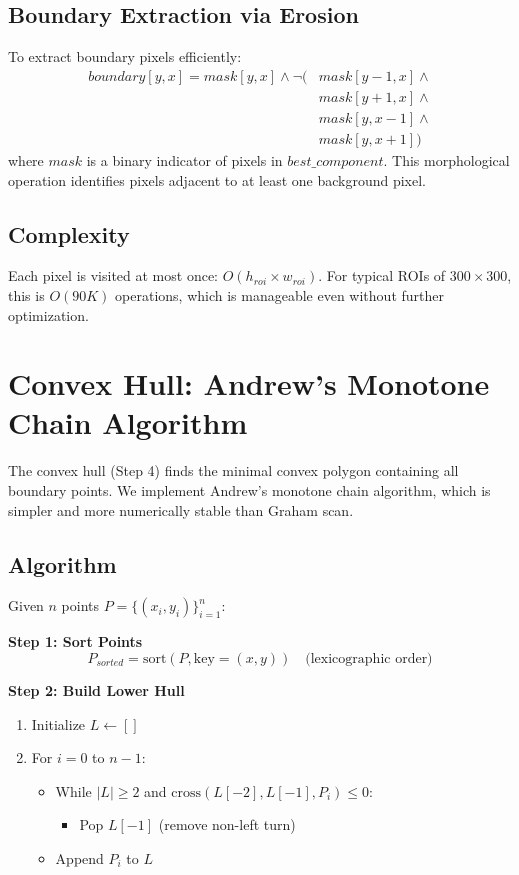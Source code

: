 \documentclass[9pt,a4paper,twocolumn,twoside]{tau-class/tau}
\begin{document}
    \subsection{Boundary Extraction via Erosion}

    To extract boundary pixels efficiently:
    \begin{align}
        boundary[y, x] = mask[y, x] \land \neg (&mask[y-1, x] \land \nonumber\\
        &mask[y+1, x] \land \nonumber\\
        &mask[y, x-1] \land \nonumber\\
        &mask[y, x+1])
    \end{align}
    where $mask$ is a binary indicator of pixels in $best\_component$. This morphological operation identifies pixels adjacent to at least one background pixel.

    \subsection{Complexity}

    Each pixel is visited at most once: $O(h_{roi} \times w_{roi})$. For typical ROIs of $300 \times 300$, this is $O(90K)$ operations, which is manageable even without further optimization.

\section{Convex Hull: Andrew's Monotone Chain Algorithm}

    The convex hull (Step 4) finds the minimal convex polygon containing all boundary points. We implement Andrew's monotone chain algorithm, which is simpler and more numerically stable than Graham scan.

    \subsection{Algorithm}

    Given $n$ points $P = \{(x_i, y_i)\}_{i=1}^n$:

    \textbf{Step 1: Sort Points}
    \begin{equation}
        P_{sorted} = \text{sort}(P, \text{key}=(x, y)) \quad \text{(lexicographic order)}
    \end{equation}

    \textbf{Step 2: Build Lower Hull}
    \begin{enumerate}
        \item Initialize $L \leftarrow []$
        \item For $i = 0$ to $n-1$:
        \begin{itemize}
            \item While $|L| \geq 2$ and $\text{cross}(L[-2], L[-1], P_i) \leq 0$:
            \begin{itemize}
                \item Pop $L[-1]$ (remove non-left turn)
            \end{itemize}
            \item Append $P_i$ to $L$
        \end{itemize}
    \end{enumerate}
\end{document}
